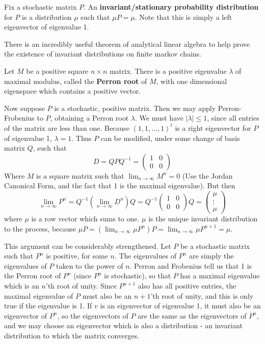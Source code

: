\begin{definition}
    Fix a stochastic matrix $P$. An {\bf invariant/stationary probability distribution} for $P$ is a distribution $\mu$ such that $\mu P = \mu$. Note that this is simply a left eigenvector of eigenvalue 1.
\end{definition}

There is an incredibly useful theorem of analytical linear algebra to help prove the existence of invariant distributions on finite markov chains.

\begin{theorem}
    Let $M$ be a positive square $n \times n$ matrix. There is a positive eigenvalue $\lambda$ of maximal modulus, called the {\bf Perron root} of $M$, with one dimensional eigenspace which contains a positive vector.
\end{theorem}

Now suppose $P$ is a stochastic, positive matrix. Then we may apply Perron-Frobenius to $P$, obtaining a Perron root $\lambda$. We must have $|\lambda| \leq 1$, since all entries of the matrix are less than one. Because $(1,1,\dots,1)^t$ is a right eigenvector for $P$ of eigenvalue 1, $\lambda = 1$. Thus $P$ can be modified, under some change of basis matrix $Q$, such that
%
\[ D = QPQ^{-1} = \begin{pmatrix} 1 & 0 \\0 & 0 \end{pmatrix} \]
%
Where $M$ is a square matrix such that $\lim_{n \to \infty} M^n = 0$ (Use the Jordan Canonical Form, and the fact that 1 is the maximal eigenvalue). But then
%
\[ \lim_{n \to \infty} P^n = Q^{-1} (\lim_{n \to \infty} D^n) Q = Q^{-1} \begin{pmatrix} 1 & 0 \\ 0 & 0 \end{pmatrix} Q = \begin{pmatrix} \mu \\ \vdots \\ \mu \end{pmatrix} \]
%
where $\mu$ is a row vector which sums to one. $\mu$ is the unique invariant distribution to the process, because $\mu P = (\lim_{n \to \infty} \mu P^n) P = \lim_{n \to \infty} \mu P^{n+1} = \mu$.

This argument can be considerably strengthened. Let $P$ be a stochastic matrix such that $P^n$ is positive, for some $n$. The eigenvalues of $P^n$ are simply the eigenvalues of $P$ taken to the power of $n$. Perron and Frobenius tell us that 1 is the Perron root of $P^n$ (since $P^n$ is stochastic), so that $P$ has a maximal eigenvalue which is an $n$'th root of unity. Since $P^{n+1}$ also has all positive entries, the maximal eigenvalue of $P$ must also be an $n+1$'th root of unity, and this is only true if the eigenvalue is 1. If $v$ is an eigenvector of eigenvalue 1, it must also be an eigenvector of $P^n$, so the eigenvectors of $P$ are the same as the eigenvectors of $P^n$, and we may choose an eigenvector which is also a distribution - an invariant distribution to which the matrix converges.


